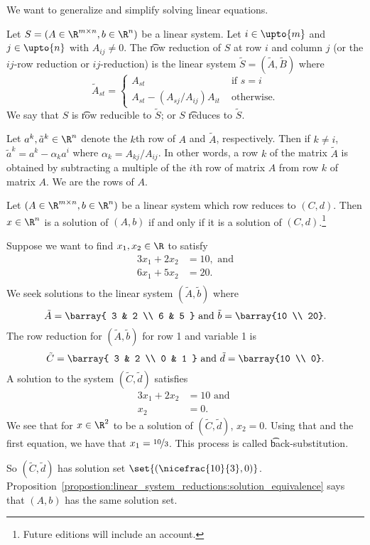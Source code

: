 

We want to generalize and simplify solving linear equations.


Let $S = (A \in \R^{m \times n}, b \in \R^{n})$ be a linear system.
Let $i \in \upto{m}$ and $j \in \upto{n}$ with $A_{ij} \neq 0$.
The \t{row reduction} of $S$ at row $i$ and column $j$ (or the \t{$ij$-row reduction} or \t{$ij$-reduction}) is the linear system $\tilde{S} = (\tilde{A}, \tilde{B})$ where
\[
  \tilde{A}_{st} = \begin{cases}
    A_{st} & \text{ if } s = i \\
    A_{st} - (A_{sj}/A_{ij})A_{it} & \text{ otherwise.}
  \end{cases}
\]
We say that $S$ is \t{row reducible} to $\tilde{S}$; or $S$ \t{reduces} to $\tilde{S}$.

Let $a^k, \tilde{a}^k \in \R^{n}$ denote the $k$th row of $A$ and $\tilde{A}$, respectively.
Then if $k \neq i$, $\tilde{a}^k = a^k - \alpha_k a^i$ where $\alpha_k = A_{kj}/A_{ij}$.
In other words, a row $k$ of the matrix $\tilde{A}$ is obtained by subtracting a multiple of the $i$th row of matrix $A$ from row $k$ of matrix $A$.
We are  the rows of $A$.

\begin{proposition}
  Let $(A \in \R^{m \times n}, b \in \R^{n})$ be a linear system which row reduces to $(C, d)$.
  Then $x \in \R^{n}$ is a solution of $(A, b)$ if and only if it is a solution of $(C, d)$.\footnote{Future editions will include an account.}
  \label{propostion:linear_system_reductions:solution_equivalence}
\end{proposition}


Suppose we want to find $x_1, x_2 \in \R$ to satisfy
\[
\begin{aligned}
  3x_1 + 2x_2 &= 10, \text{ and} \\
  6x_1 + 5x_2 &= 20. \\
\end{aligned}
\]
We seek solutions to the linear system $(\tilde{A}, \tilde{b})$ where
\[
  \tilde{A} = \barray{
    3 & 2 \\
    6 & 5
  } \text{ and } \tilde{b} = \barray{10 \\ 20}.
\]
The row reduction for $(\tilde{A}, \tilde{b})$ for row 1 and variable 1 is
\[
  \tilde{C} = \barray{
    3 & 2 \\
    0 & 1
  } \text{ and } \tilde{d} = \barray{10 \\ 0}.
\]
A solution to the system $(\tilde{C}, \tilde{d})$ satisfies
\[
  \begin{aligned}
    3x_1 + 2x_2 &= 10 \text{ and } \\
    x_2 &= 0.
  \end{aligned}
\]
We see that for $x \in \R^2$ to be a solution of $(\tilde{C}, \tilde{d})$, $x_2 = 0$.
Using that and the first equation, we have that $x_1 = \nicefrac{10}{3}$.
This process is called \t{back-substitution}.

So $(\tilde{C}, \tilde{d})$ has solution set $\set{(\nicefrac{10}{3}, 0)}$.
Proposition~\ref{propostion:linear_system_reductions:solution_equivalence} says that $(A, b)$ has the same solution set.